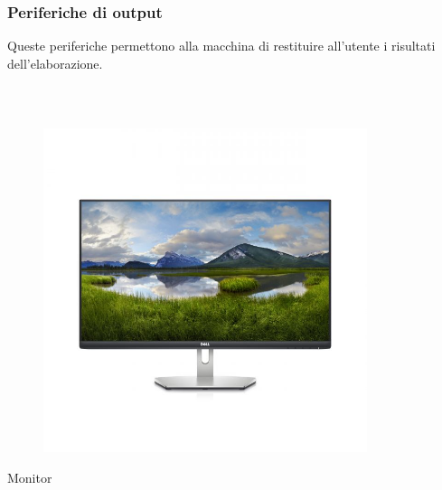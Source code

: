 \documentclass[]{beamer}
\begin{document}
\begin{frame}
\frametitle{Periferiche di output}
Queste periferiche permettono alla macchina di \alert<1>{restituire all'utente i risultati dell'elaborazione}.

~

\begin{columns}
\begin{column}{.22\textwidth}
  \begin{center}
  \begin{figure}
    \includegraphics[width=\columnwidth]{img/monitor.jpg}
  \end{figure}
  Monitor
  \end{center}
\end{column}
\begin{column}{.22\textwidth}
  \begin{center}
    \begin{figure}

\end{figure}
\end{center}
\end{column}
\end{columns}
\end{frame}
\end{document}
